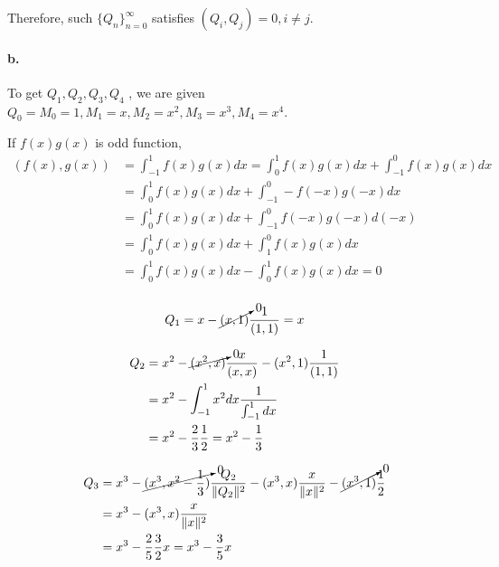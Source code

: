 \documentclass{article}
\begin{document}
Therefore, such $\{Q_n\}^{\infty}_{n=0}$ satisfies $(Q_i,Q_j)=0, i \neq j $.

\paragraph{b.}
To get $Q_1, Q_2, Q_3, Q_4$ , we are given $Q_0 = M_0 = 1, M_1=x, M_2= x^2 , M_3=x^3, M_4 = x^4$.

If $f(x)g(x)$ is odd function,
\begin{equation}
  \begin{split}
    (f(x),g(x)) &= \int^{1}_{-1} f(x)g(x) dx =  \int^{1}_{0} f(x)g(x) dx +  \int^{0}_{-1} f(x)g(x) dx\\
    &=  \int^{1}_{0} f(x)g(x) dx + \int^{0}_{-1} -f(-x)g(-x) dx\\
    &=  \int^{1}_{0} f(x)g(x) dx + \int^{0}_{-1} f(-x)g(-x) d(-x)\\
    &=  \int^{1}_{0} f(x)g(x) dx + \int^{0}_{1} f(x)g(x) dx\\
    &=  \int^{1}_{0} f(x)g(x) dx - \int^{1}_{0} f(x)g(x) dx = 0\\
  \end{split}
\end{equation}


\begin{equation}
  Q_1 = x - \cancelto{0}{(x,1)}\frac{1}{(1,1)} = x
\end{equation}

\begin{equation}
  \begin{split}
    Q_2 &= x^2 - \cancelto{0}{(x^2,x)} \frac{x}{(x,x)} - (x^2,1)\frac{1}{(1,1)}\\
    &= x^2 -  \int^{1}_{-1} x^2 dx \frac{1}{\int^{1}_{-1} dx}\\
    &= x^2 -  \frac{2}{3} \frac{1}{2} = x^2 -  \frac{1}{3}
  \end{split}
\end{equation}

\begin{equation}
  \begin{split}
    Q_3 &= x^3 - \cancelto{0}{(x^3, x^2 -  \frac{1}{3})} \frac{Q_2}{\Vert Q_2 \Vert^2} - (x^3,x)\frac{x}{\Vert x \Vert^2} - \cancelto{0}{(x^3,1)}\frac{1}{2}\\
    &= x^3 - (x^3,x)\frac{x}{\Vert x \Vert^2}\\
    &= x^3 - \frac{2}{5} \frac{3}{2} x = x^3 - \frac{3}{5}x
  \end{split}
\end{equation}
\end{document}
